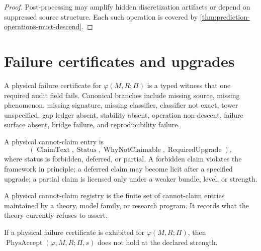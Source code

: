\begin{proof}
Post-processing may amplify hidden discretization artifacts or depend on suppressed source structure. Each such operation is covered by \autoref{thm:prediction-operations-must-descend}.
\end{proof}

\section{Failure certificates and upgrades}
\label{sec:failure-certificates-upgrades}

\begin{definition}
\label{def:physical-failure-certificate-audit}
A physical failure certificate for $\varphi(M,R;\Pi)$ is a typed witness that one required audit field fails. Canonical branches include missing source, missing phenomenon, missing signature, missing classifier, classifier not exact, tower unspecified, gap ledger absent, stability absent, operation non-descent, failure surface absent, bridge failure, and reproducibility failure.
\end{definition}

\begin{definition}
\label{def:physical-cannot-claim-entry}
A physical cannot-claim entry is
$$
(\operatorname{ClaimText},
\operatorname{Status},
\operatorname{WhyNotClaimable},
\operatorname{RequiredUpgrade}),
$$
where status is forbidden, deferred, or partial. A forbidden claim violates the framework in principle; a deferred claim may become licit after a specified upgrade; a partial claim is licensed only under a weaker bundle, level, or strength.
\end{definition}

\begin{definition}
\label{def:physical-cannot-claim-registry}
A physical cannot-claim registry is the finite set of cannot-claim entries maintained by a theory, model family, or research program. It records what the theory currently refuses to assert.
\end{definition}

\begin{theorem}
\label{thm:failure-certificates-block-acceptance}
If a physical failure certificate is exhibited for $\varphi(M,R;\Pi)$, then $\operatorname{PhysAccept}(\varphi,M,R;\Pi,s)$ does not hold at the declared strength.
\end{theorem}

